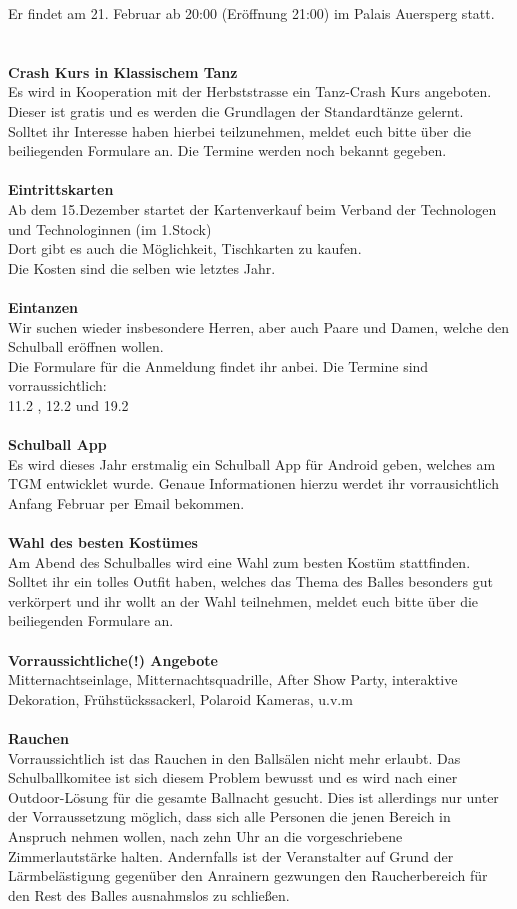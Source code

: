 \documentclass[12pt]{article}
\begin{document}
Er findet am 21. Februar ab 20:00 (Eröffnung 21:00) im Palais Auersperg statt.\\
\\ \\
\textbf{Crash Kurs in Klassischem Tanz} \\
Es wird in Kooperation mit der Herbststrasse ein Tanz-Crash Kurs angeboten. Dieser ist gratis und es werden die Grundlagen der Standardtänze gelernt. \\
Solltet ihr Interesse haben hierbei teilzunehmen, meldet euch bitte über die beiliegenden Formulare an. Die Termine werden noch bekannt gegeben.
\\ \\
\textbf{Eintrittskarten} \\
Ab dem 15.Dezember startet der Kartenverkauf beim  Verband der Technologen und Technologinnen (im 1.Stock) \\
Dort gibt es auch die Möglichkeit, Tischkarten zu kaufen. \\
Die Kosten sind die selben wie letztes Jahr.
\\ \\
\textbf{Eintanzen} \\
Wir suchen wieder insbesondere Herren, aber auch Paare und Damen, welche den Schulball eröffnen wollen. \\
Die Formulare für die Anmeldung findet ihr anbei. Die Termine sind vorraussichtlich: \\
11.2 , 12.2 und 19.2 \\ \\
\textbf{Schulball App} \\
Es wird dieses Jahr erstmalig ein Schulball App für Android geben, welches am TGM entwicklet wurde. Genaue Informationen hierzu werdet ihr vorrausichtlich Anfang Februar per Email bekommen.
\\ \\
\textbf{Wahl des besten Kostümes} \\
Am Abend des Schulballes wird eine Wahl zum besten Kostüm stattfinden. \\
Solltet ihr ein tolles Outfit haben, welches das Thema des Balles besonders gut verkörpert und ihr wollt an der Wahl teilnehmen, meldet euch bitte über die beiliegenden Formulare an.
\\ \\
\textbf{Vorraussichtliche(!) Angebote} \\
Mitternachtseinlage, Mitternachtsquadrille, After Show Party, interaktive Dekoration, Frühstückssackerl, Polaroid Kameras, u.v.m
\\ \\
\textbf{Rauchen} \\
Vorraussichtlich ist das Rauchen in den Ballsälen nicht mehr erlaubt.
Das Schulballkomitee ist sich diesem Problem bewusst und es wird nach einer Outdoor-Lösung für die gesamte Ballnacht gesucht. Dies ist allerdings nur unter der Vorraussetzung möglich, dass sich alle Personen die jenen Bereich in Anspruch nehmen wollen, nach zehn Uhr an die vorgeschriebene Zimmerlautstärke halten.  Andernfalls ist der Veranstalter auf Grund der Lärmbelästigung gegenüber den Anrainern gezwungen den Raucherbereich für den Rest des Balles ausnahmslos zu schließen.
\end{document}
